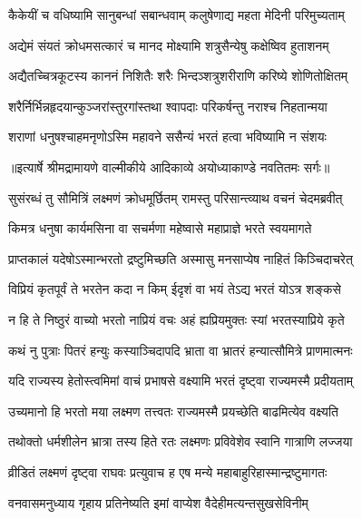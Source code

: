 \twolineshloka
{कैकेयीं च वधिष्यामि सानुबन्धां सबान्धवाम्}
{कलुषेणाद्य महता मेदिनी परिमुच्यताम्} %

\twolineshloka
{अद्येमं संयतं क्रोधमसत्कारं च मानद}
{मोक्ष्यामि शत्रुसैन्येषु कक्षेष्विव हुताशनम्} %

\twolineshloka
{अद्यैतच्चित्रकूटस्य काननं निशितैः शरैः}
{भिन्दञ्शत्रुशरीराणि करिष्ये शोणितोक्षितम्} %

\twolineshloka
{शरैर्निर्भिन्नहृदयान्कुञ्जरांस्तुरगांस्तथा}
{श्वापदाः परिकर्षन्तु नराश्च निहतान्मया} %

\twolineshloka
{शराणां धनुषश्चाहमनृणोऽस्मि महावने}
{ससैन्यं भरतं हत्वा भविष्यामि न संशयः} %


{॥इत्यार्षे श्रीमद्रामायणे वाल्मीकीये आदिकाव्ये अयोध्याकाण्डे नवतितमः सर्गः॥}


\twolineshloka
{सुसंरब्धं तु सौमित्रिं लक्ष्मणं क्रोधमूर्छितम्}
{रामस्तु परिसान्त्व्याथ वचनं चेदमब्रवीत्} %

\twolineshloka
{किमत्र धनुषा कार्यमसिना वा सचर्मणा}
{महेष्वासे महाप्राज्ञे भरते स्वयमागते} %

\twolineshloka
{प्राप्तकालं यदेषोऽस्मान्भरतो द्रष्टुमिच्छति}
{अस्मासु मनसाप्येष नाहितं किञ्चिदाचरेत्} %

\twolineshloka
{विप्रियं कृतपूर्वं ते भरतेन कदा न किम्}
{ईदृशं वा भयं तेऽद्य भरतं योऽत्र शङ्कसे} %

\twolineshloka
{न हि ते निष्ठुरं वाच्यो भरतो नाप्रियं वचः}
{अहं ह्यप्रियमुक्तः स्यां भरतस्याप्रिये कृते} %

\twolineshloka
{कथं नु पुत्राः पितरं हन्युः कस्याञ्चिदापदि}
{भ्राता वा भ्रातरं हन्यात्सौमित्रे प्राणमात्मनः} %

\twolineshloka
{यदि राज्यस्य हेतोस्त्वमिमां वाचं प्रभाषसे}
{वक्ष्यामि भरतं दृष्ट्वा राज्यमस्मै प्रदीयताम्} %

\twolineshloka
{उच्यमानो हि भरतो मया लक्ष्मण तत्त्वतः}
{राज्यमस्मै प्रयच्छेति बाढमित्येव वक्ष्यति} %

\twolineshloka
{तथोक्तो धर्मशीलेन भ्रात्रा तस्य हिते रतः}
{लक्ष्मणः प्रविवेशेव स्वानि गात्राणि लज्जया} %

\twolineshloka
{व्रीडितं लक्ष्मणं दृष्ट्वा राघवः प्रत्युवाच ह}
{एष मन्ये महाबाहुरिहास्मान्द्रष्टुमागतः} %

\twolineshloka
{वनवासमनुध्याय गृहाय प्रतिनेष्यति}
{इमां वाप्येश वैदेहीमत्यन्तसुखसेविनीम्} %

